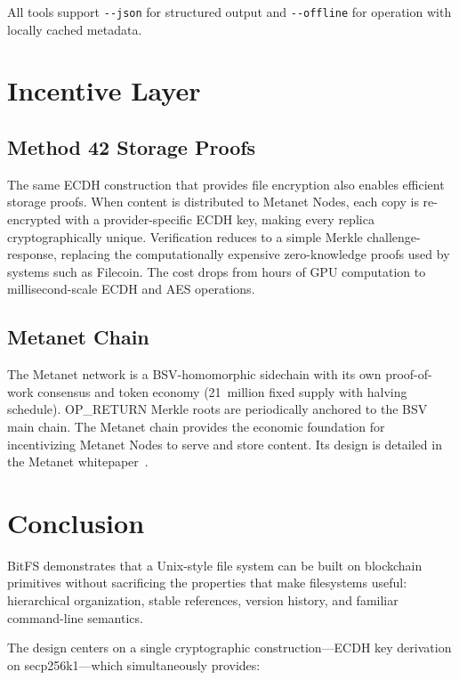 \documentclass[11pt,a4paper]{article}
\begin{document}
All tools support \texttt{-{}-json} for structured output and \texttt{-{}-offline} for operation with locally cached metadata.

\section{Incentive Layer}

\subsection{Method 42 Storage Proofs}

The same ECDH construction that provides file encryption also enables efficient storage proofs. When content is distributed to Metanet Nodes, each copy is re-encrypted with a provider-specific ECDH key, making every replica cryptographically unique. Verification reduces to a simple Merkle challenge-response, replacing the computationally expensive zero-knowledge proofs used by systems such as Filecoin. The cost drops from hours of GPU computation to millisecond-scale ECDH and AES operations.

\subsection{Metanet Chain}

The Metanet network is a BSV-homomorphic sidechain with its own proof-of-work consensus and token economy (21~million fixed supply with halving schedule). OP\_RETURN Merkle roots are periodically anchored to the BSV main chain. The Metanet chain provides the economic foundation for incentivizing Metanet Nodes to serve and store content. Its design is detailed in the Metanet whitepaper~\cite{metanet_multi}.

\section{Conclusion}

BitFS demonstrates that a Unix-style file system can be built on blockchain primitives without sacrificing the properties that make filesystems useful: hierarchical organization, stable references, version history, and familiar command-line semantics.

The design centers on a single cryptographic construction---ECDH key derivation on secp256k1---which simultaneously provides:
\end{document}
